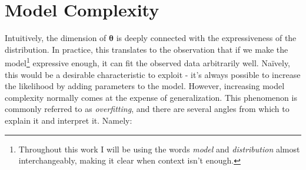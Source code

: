 \section{Model Complexity}
\label{section:modelcomplexity}
Intuitively, the dimension of $\bm{\theta}$ is deeply connected with the expressiveness
of the distribution. In practice, this translates to the observation that if we
make the model\footnote{Throughout this work I will be using the words \emph{model}
and \emph{distribution} almost interchangeably, making it clear when context isn't
enough.} expressive enough, it can fit the observed data arbitrarily well. Naïvely,
this would be a desirable characteristic to exploit - it's always possible to increase
the likelihood by adding parameters to the model. However, increasing model
complexity normally comes at the expense of generalization. This phenomenon is
commonly referred to as \emph{overfitting}, and there are several
angles from which to explain it and interpret it. Namely:
